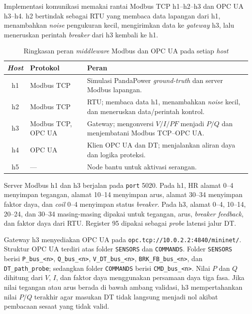 Implementasi komunikasi memakai rantai Modbus TCP h1--h2--h3 dan OPC UA h3--h4. h2 bertindak sebagai RTU yang membaca data lapangan dari h1, menambahkan \textit{noise} pengukuran kecil, mengirimkan data ke \textit{gateway} h3, lalu meneruskan perintah \textit{breaker} dari h3 kembali ke h1.

\begin{table}[htbp]
\centering
\caption{Ringkasan peran \textit{middleware} Modbus dan OPC UA pada setiap \textit{host}}
\label{tab:middleware_hosts_impl}

\begin{tabularx}{\textwidth}{|c|l|X|}
\hline
\textbf{\textit{Host}} &
\textbf{Protokol} &
\textbf{Peran} \\ \hline

h1 &
Modbus TCP &
Simulasi PandaPower \textit{ground-truth} dan server Modbus lapangan. \\ \hline

h2 &
Modbus TCP &
RTU; membaca data h1, menambahkan \textit{noise} kecil, dan meneruskan data/perintah kontrol. \\ \hline

h3 &
Modbus TCP, OPC UA &
Gateway; mengonversi $V/I/PF$ menjadi $P/Q$ dan menjembatani Modbus TCP--OPC UA. \\ \hline

h4 &
OPC UA &
Klien OPC UA dan \ac{DT}; menjalankan aliran daya dan logika proteksi. \\ \hline

h5 &
--- &
Node bantu untuk aktivasi serangan. \\ \hline

\end{tabularx}
\end{table}

Server Modbus h1 dan h3 berjalan pada \texttt{port} 5020. Pada h1, \ac{HR} alamat 0--4 menyimpan tegangan, alamat 10--14 menyimpan arus, alamat 30--34 menyimpan faktor daya, dan \textit{coil} 0--4 menyimpan status \textit{breaker}. Pada h3, alamat 0--4, 10--14, 20--24, dan 30--34 masing-masing dipakai untuk tegangan, arus, \textit{breaker feedback}, dan faktor daya dari RTU. Register 95 dipakai sebagai \textit{probe} latensi jalur \ac{DT}.

Gateway h3 menyediakan OPC UA pada \texttt{opc.tcp://10.0.2.2:4840/mininet/}. Struktur OPC UA terdiri atas folder \texttt{SENSORS} dan \texttt{COMMANDS}. Folder \texttt{SENSORS} berisi \texttt{P\_bus\_<n>}, \texttt{Q\_bus\_<n>}, \texttt{V\_DT\_bus\_<n>}, \texttt{BRK\_FB\_bus\_<n>}, dan \texttt{DT\_path\_probe}; sedangkan folder \texttt{COMMANDS} berisi \texttt{CMD\_bus\_<n>}. Nilai $P$ dan $Q$ dihitung dari $V$, $I$, dan faktor daya menggunakan persamaan daya tiga fasa. Jika nilai tegangan atau arus berada di bawah ambang validasi, h3 mempertahankan nilai $P/Q$ terakhir agar masukan \ac{DT} tidak langsung menjadi nol akibat pembacaan sesaat yang tidak valid.

